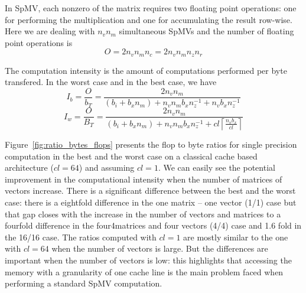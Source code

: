 \documentclass[10pt,conference,compsocconf]{IEEEtran}
\newcommand{\todo}[1]{{\color{red}\textbf{\hl{#1}}\xspace}}
\newcommand{\ceil}[1]{\left\lceil#1\right\rceil}
\begin{document}
In SpMV, each nonzero of the matrix requires two floating point
operations: one for performing the multiplication and one for
accumulating the result row-wise. Here we are dealing with $n_v n_m$
simultaneous SpMVs and the number of floating point operations is
$$O = 2 n_v n_m n_c = 2 n_v n_m n_z n_r$$

The computation intensity is the amount of computations performed per
byte transfered. In the worst case and in the best case, we have
$$I_b = \frac{O}{b_T} = \frac{2 n_v n_m}{ (b_i + b_x n_m) + n_v n_m b_x n_z^{-1} + n_v b_x n_z^{-1} }$$
$$I_w = \frac{O}{B_T} = \frac{2 n_v n_m}{(b_i+b_x n_m) + n_v n_m b_x n_z^{-1} + cl \ceil{\frac{n_vb_x}{cl}} }$$


Figure~\ref{fig:ratio_bytes_flops} presents the flop to byte ratios
for single precision computation in the best and the worst case on a
classical cache based architecture ($cl = 64$) and assuming $cl=1$. We
can easily see the potential improvement in the computational
intensity when the number of matrices of vectors increase. There is a
significant difference between the best and the worst case: there is a
eightfold difference in the one matrix -- one vector (1/1) case but that gap closes
with the increase in the number of vectors and matrices to a fourfold
difference in the four4matrices and four vectors (4/4) case and 1.6 fold in the 
16/16 case. 
The ratios computed with $cl = 1$ are mostly
similar to the one with $cl=64$ when the number of vectors is
large. But the differences are important when the number of vectors is
low: this highlights that accessing the memory with a granularity of one cache
line %
is the main problem faced when performing a standard SpMV computation.
\end{document}
